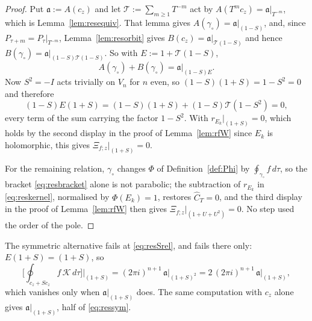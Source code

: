 \documentclass[11pt]{article}
\begin{document}
\begin{proof}
Put $\mathfrak a:=A(c_z)$ and let $\mathcal T:=\sum_{m\ge1}T^{-m}$ act by
$A(T^mc_z)=\mathfrak a|_{T^{-m}}$, which is Lemma~\ref{lem:resequiv}. That lemma gives
$A(\gamma_\circ)=\mathfrak a|_{(1-S)}$, and, since $P_{\tau+m}=P_\tau|_{T^{-m}}$,
Lemma~\ref{lem:resorbit} gives $B(c_z)=\mathfrak a|_{\mathcal T(1-S)}$ and hence
$B(\gamma_\circ)=\mathfrak a|_{(1-S)\mathcal T(1-S)}$. So with $E:=1+\mathcal T(1-S)$,
\begin{equation}\label{eq:resbracket}
A(\gamma_\circ)+B(\gamma_\circ)=\mathfrak a\big|_{(1-S)E}.
\end{equation}
Now $S^2=-I$ acts trivially on $V_n$ for $n$ even, so $(1-S)(1+S)=1-S^2=0$ and therefore
\begin{equation}\label{eq:resSrel}
(1-S)E(1+S)=(1-S)(1+S)+(1-S)\mathcal T(1-S^2)=0 ,
\end{equation}
every term of the sum carrying the factor $1-S^2$. With $r_{E_k}|_{(1+S)}=0$, which holds by the
second display in the proof of Lemma~\ref{lem:rfW} since $E_k$ is holomorphic, this gives
$\Xi_{f;z}|_{(1+S)}=0$.

For the remaining relation, $\gamma_\circ$ changes $\Phi$ of Definition~\ref{def:Phi} by
$\oint_{\gamma_\circ}f\,d\tau$, so the bracket \eqref{eq:resbracket} alone is not parabolic; the
subtraction of $r_{E_k}$ in \eqref{eq:reskernel}, normalised by $\Phi(E_k)=1$, restores
$\hat C_T=0$, and the third display in the proof of Lemma~\ref{lem:rfW} then gives
$\Xi_{f;z}|_{(1+U+U^2)}=0$. No step used the order of the pole.
\end{proof}

The symmetric alternative fails at \eqref{eq:resSrel}, and fails there only: $E(1+S)=(1+S)$, so
\begin{equation}\label{eq:ressym}
\Big[\oint_{c_z+Sc_z}f\,\mathcal K\,d\tau\Big]\Big|_{(1+S)}
=(2\pi i)^{n+1}\,\mathfrak a\big|_{(1+S)^2}=2\,(2\pi i)^{n+1}\,\mathfrak a\big|_{(1+S)},
\end{equation}
which vanishes only when $\mathfrak a|_{(1+S)}$ does. The same computation with $c_z$ alone gives
$\mathfrak a|_{(1+S)}$, half of \eqref{eq:ressym}. 
\end{document}
